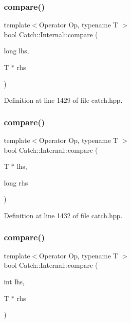 \subsubsection{\texorpdfstring{compare()}{compare()}\hspace{0.1cm}{\footnotesize\ttfamily [14/17]}}
{\footnotesize\ttfamily template$<$Operator Op, typename T $>$ \\
bool Catch\+::\+Internal\+::compare (\begin{DoxyParamCaption}\item[{long}]{lhs,  }\item[{T $\ast$}]{rhs }\end{DoxyParamCaption})}



Definition at line 1429 of file catch.\+hpp.

\hypertarget{namespace_catch_1_1_internal_a3f89c65fdb06aa7b648c5acf0ca107a9}{}\label{namespace_catch_1_1_internal_a3f89c65fdb06aa7b648c5acf0ca107a9} 
\subsubsection{\texorpdfstring{compare()}{compare()}\hspace{0.1cm}{\footnotesize\ttfamily [15/17]}}
{\footnotesize\ttfamily template$<$Operator Op, typename T $>$ \\
bool Catch\+::\+Internal\+::compare (\begin{DoxyParamCaption}\item[{T $\ast$}]{lhs,  }\item[{long}]{rhs }\end{DoxyParamCaption})}



Definition at line 1432 of file catch.\+hpp.

\hypertarget{namespace_catch_1_1_internal_a4f30c29e4adb62c7e209e5b988e59397}{}\label{namespace_catch_1_1_internal_a4f30c29e4adb62c7e209e5b988e59397} 
\subsubsection{\texorpdfstring{compare()}{compare()}\hspace{0.1cm}{\footnotesize\ttfamily [16/17]}}
{\footnotesize\ttfamily template$<$Operator Op, typename T $>$ \\
bool Catch\+::\+Internal\+::compare (\begin{DoxyParamCaption}\item[{int}]{lhs,  }\item[{T $\ast$}]{rhs }\end{DoxyParamCaption})}



